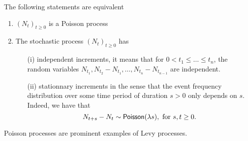 \begin{prop}
The following statements are equivalent
\begin{enumerate}
\item $(N_t)_{t\geq 0}$ is a Poisson process
\item The stochastic process $(N_t)_{t\geq 0}$ has
\begin{itemize}
\item[(i)] independent increments, it means that for $0<t_1\leq\ldots\leq t_n$, the random variables
$N_{t_1},N_{t_2}-N_{t_1},\ldots,N_{t_{n}}-N_{t_{n-1}}$
are independent.
\item[(ii)] stationnary increments in the sense that the event frequency distribution over some time period of duration $s>0$ only depends on $s$. Indeed, we have that 
$$
N_{t+s}-N_t\sim\mathsf{Poisson}(\lambda s),\text{ for }s,t\geq 0.
$$
\end{itemize}
\end{enumerate}
Poisson processes are prominent examples of Levy processes.
\end{prop}
